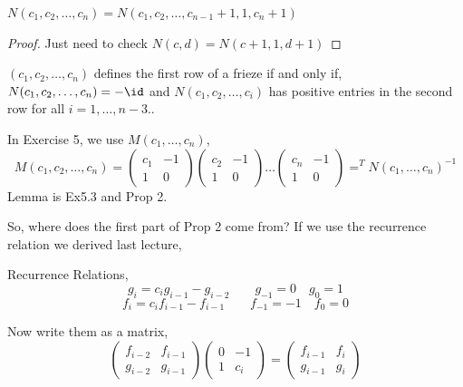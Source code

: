 \documentclass{article}
\begin{document}
\begin{prop}
  $N(c_1, c_2, \dots, c_n) = N(c_1, c_2, \dots, c_{n-1} +1, 1, c_n + 1 ) $
\end{prop}

\begin{proof}
  Just need to check $N(c, d) = N(c+1, 1, d+1)$
\end{proof}

\begin{prop}
  $(c_1, c_2, \dots, c_n)$ defines the first row of a frieze if and only if, $N(c_1, c_2, \dots, c_n) = -\id$ and $N(c_1, c_2, \dots, c_i)$ has positive entries in the second row for all $i = 1, \dots, n-3$..
\end{prop}

\begin{remark}
  In Exercise 5, we use $M(c_1, \dots, c_n)$,
  $$ M(c_1, c_2, \dots, c_n) = \begin{pmatrix}
    c_1 & -1 \\ 1 & 0
\end{pmatrix}\begin{pmatrix}
  c_2 & -1 \\ 1 & 0
\end{pmatrix} \dots \begin{pmatrix}
  c_n & -1 \\ 1 & 0
\end{pmatrix} = ^TN(c_1, \dots, c_n)^{-1}$$
Lemma is Ex5.3 and Prop 2.
\end{remark}

So, where does the first part of Prop 2 come from? If we use the recurrence relation we derived last lecture,
\begin{recall}
  Recurrence Relations,
  $$ g_i = c_ig_{i-1}-g_{i-2} \qquad  g_{-1} = 0 \quad g_0 = 1$$
  $$ f_i = c_i f_{i-1} - f_{i-1} \qquad f_{-1} = -1 \quad f_0 = 0 $$
\end{recall}

Now write them as a matrix,
$$ \begin{pmatrix}
  f_{i-2} & f_{i-1} \\ g_{i-2} & g_{i-1}
\end{pmatrix}\begin{pmatrix}
  0 & -1 \\ 1 & c_i
\end{pmatrix} = \begin{pmatrix}
  f_{i-1} & f_{i} \\ g_{i-1} & g_{i}
\end{pmatrix} $$
\end{document}

